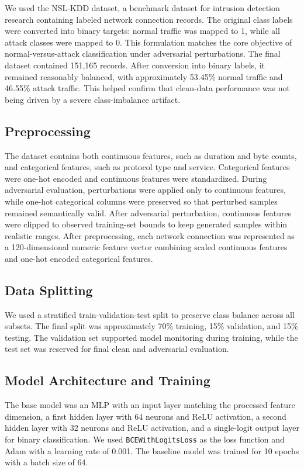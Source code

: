 \documentclass[11pt]{article}
\begin{document}
We used the NSL-KDD dataset, a benchmark dataset for intrusion detection research containing labeled network connection records. The original class labels were converted into binary targets: normal traffic was mapped to 1, while all attack classes were mapped to 0. This formulation matches the core objective of normal-versus-attack classification under adversarial perturbations.
The final dataset contained 151,165 records. After conversion into binary labels, it remained reasonably balanced, with approximately 53.45\% normal traffic and 46.55\% attack traffic. This helped confirm that clean-data performance was not being driven by a severe class-imbalance artifact.

\subsection{Preprocessing}

The dataset contains both continuous features, such as duration and byte counts, and categorical features, such as protocol type and service. Categorical features were one-hot encoded and continuous features were standardized. During adversarial evaluation, perturbations were applied only to continuous features, while one-hot categorical columns were preserved so that perturbed samples remained semantically valid. After adversarial perturbation, continuous features were clipped to observed training-set bounds to keep generated samples within realistic ranges.
After preprocessing, each network connection was represented as a 120-dimensional numeric feature vector combining scaled continuous features and one-hot encoded categorical features.

\subsection{Data Splitting}

We used a stratified train-validation-test split to preserve class balance across all subsets. The final split was approximately 70\% training, 15\% validation, and 15\% testing. The validation set supported model monitoring during training, while the test set was reserved for final clean and adversarial evaluation.

\subsection{Model Architecture and Training}

The base model was an MLP with an input layer matching the processed feature dimension, a first hidden layer with 64 neurons and ReLU activation, a second hidden layer with 32 neurons and ReLU activation, and a single-logit output layer for binary classification. We used \texttt{BCEWithLogitsLoss} as the loss function and Adam with a learning rate of 0.001. The baseline model was trained for 10 epochs with a batch size of 64.
\end{document}
